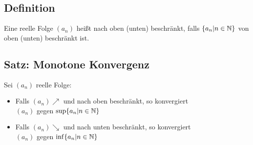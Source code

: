 \documentclass[10pt,a4paper]{article}
\begin{document}
    \subsection{Definition}
    Eine reelle Folge $(a_n)$ heißt nach oben (unten) beschränkt, falls
    $\{a_n | n \in \mathbb{N}\}$ von oben (unten) beschränkt ist.

    \subsection{Satz: Monotone Konvergenz}

    Sei $(a_n)$ reelle Folge:
    \begin{itemize}
        \item Falls $(a_n) \nearrow$ und nach oben beschränkt, so konvergiert \\
        $(a_n)$ gegen $\sup\{a_n | n \in \mathbb{N}\}$
        \item Falls $(a_n) \searrow$ und nach unten beschränkt, so konvergiert \\
        $(a_n)$ gegen $\inf\{a_n | n \in \mathbb{N}\}$
    \end{itemize}
\ifdefined\MAINDOC\else
\end{document}

